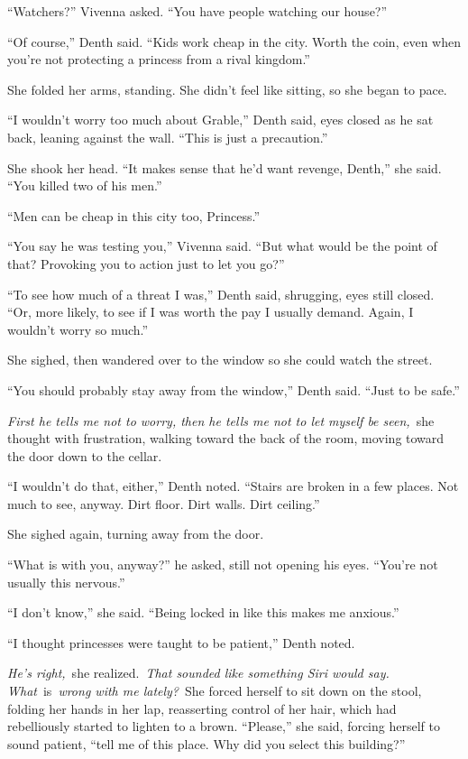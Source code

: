 “Watchers?” Vivenna asked. “You have people watching our house?”

“Of course,” Denth said. “Kids work cheap in the city. Worth the coin, even when you’re not protecting a princess from a rival kingdom.”

She folded her arms, standing. She didn’t feel like sitting, so she began to pace.

“I wouldn’t worry too much about Grable,” Denth said, eyes closed as he sat back, leaning against the wall. “This is just a precaution.”

She shook her head. “It makes sense that he’d want revenge, Denth,” she said. “You killed two of his men.”

“Men can be cheap in this city too, Princess.”

“You say he was testing you,” Vivenna said. “But what would be the point of that? Provoking you to action just to let you go?”

“To see how much of a threat I was,” Denth said, shrugging, eyes still closed. “Or, more likely, to see if I was worth the pay I usually demand. Again, I wouldn’t worry so much.”

She sighed, then wandered over to the window so she could watch the street.

“You should probably stay away from the window,” Denth said. “Just to be safe.”

\textit{First he tells me not to worry, then he tells me not to let myself be seen,}~she thought with frustration, walking toward the back of the room, moving toward the door down to the cellar.

“I wouldn’t do that, either,” Denth noted. “Stairs are broken in a few places. Not much to see, anyway. Dirt floor. Dirt walls. Dirt ceiling.”

She sighed again, turning away from the door.

“What is with you, anyway?” he asked, still not opening his eyes. “You’re not usually this nervous.”

“I don’t know,” she said. “Being locked in like this makes me anxious.”

“I thought princesses were taught to be patient,” Denth noted.

\textit{He’s right,}~she realized.~\textit{That sounded like something Siri would say. What}~is~\textit{wrong with me lately?}~She forced herself to sit down on the stool, folding her hands in her lap, reasserting control of her hair, which had rebelliously started to lighten to a brown. “Please,” she said, forcing herself to sound patient, “tell me of this place. Why did you select this building?”

